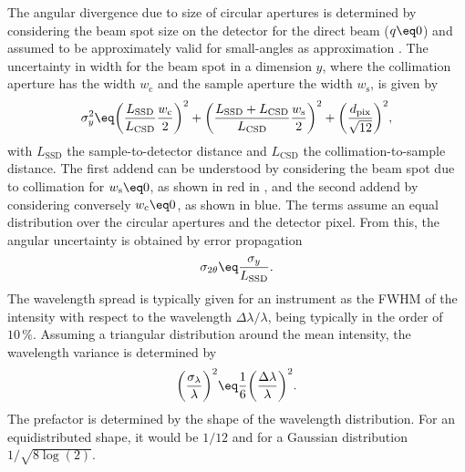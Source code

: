 \documentclass[\main/dresen_thesis.tex]{subfiles}
\begin{document}
    The angular divergence due to size of circular apertures is determined by considering the beam spot size on the detector for the direct beam ($q \eq 0$) and assumed to be approximately valid for small-angles as approximation \cite{Pedersen_1990_Analy}.
    The uncertainty in width for the beam spot in a dimension $y$, where the collimation aperture has the width $w_\mathrm{c}$ and the sample aperture the width $w_\mathrm{s}$, is given by \cite{Mildner_2005_Arefr, Hammouda_2006_Thesa}
    \begin{align}
      \sigma_y^2 \eq
        \biggl( \frac{L_\mathrm{SSD}}{L_\mathrm{CSD}} \frac{w_\mathrm{c}}{2} \biggr)^2 +
        \biggl( \frac{L_\mathrm{SSD} + L_\mathrm{CSD}}{L_\mathrm{CSD}} \frac{w_\mathrm{s}}{2} \biggr)^2 +
        \biggl( \frac{d_\mathrm{pix}}{\sqrt{12}} \biggr)^2,
    \end{align}
    with $L_\mathrm{SSD}$ the sample-to-detector distance and $L_\mathrm{CSD}$ the collimation-to-sample distance.
    The first addend can be understood by considering the beam spot due to collimation for $w_\mathrm{s} \eq 0$, as shown in red in , and the second addend by considering conversely $w_\mathrm{c} \eq 0$, as shown in blue.
    The terms assume an equal distribution over the circular apertures and the detector pixel.
    From this, the angular uncertainty is obtained by error propagation
    \begin{align}
      \label{eq:methods:sans:formulaResolution}
      \sigma_{2 \theta} \eq \frac{\sigma_{y}}{L_{\mathrm{SSD}}}.
    \end{align}
    The wavelength spread is typically given for an instrument as the FWHM of the intensity with respect to the wavelength $\Delta \lambda / \lambda$, being typically in the order of $10 \, \%$.
    Assuming a triangular distribution around the mean intensity, the wavelength variance is determined by
    \begin{align}
      \biggl( \frac{\sigma_\lambda}{\lambda} \biggr)^2 \eq \frac{1}{6} \biggl( \frac{\Delta \lambda}{\lambda} \biggr)^2.
    \end{align}
    The prefactor is determined by the shape of the wavelength distribution. For an equidistributed shape, it would be $1/12$ and for a Gaussian distribution $1/\sqrt{8\log(2)}$.
\end{document}
